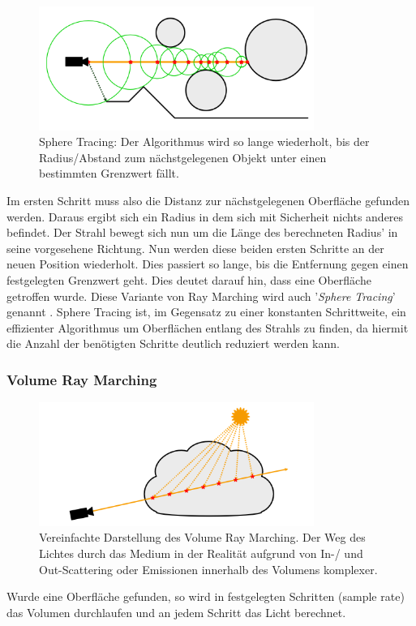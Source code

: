 \begin{figure}[h]
	\centering
	\includegraphics[width=0.80\textwidth]{Grafiken/Basics/Volume/Sphere_Tracing.png}
	\begin{footnotesize}
		\caption{Sphere Tracing: Der Algorithmus wird so lange wiederholt, bis der Radius/Abstand zum nächstgelegenen
        Objekt unter einen bestimmten Grenzwert fällt.}
	\end{footnotesize}
\end{figure}



Im ersten Schritt muss also die Distanz zur nächstgelegenen Oberfläche gefunden werden. Daraus ergibt sich ein Radius in dem sich 
mit Sicherheit nichts anderes befindet. Der Strahl bewegt sich nun um die Länge des berechneten Radius' in seine vorgesehene Richtung.
Nun werden diese beiden ersten Schritte an der neuen Position wiederholt. Dies passiert so lange, bis die Entfernung gegen einen festgelegten
Grenzwert geht. Dies deutet darauf hin, dass eine Oberfläche getroffen wurde. Diese Variante von Ray Marching wird auch 
'\textit{Sphere Tracing}' genannt \parencite{Hart96}. Sphere Tracing ist, im Gegensatz zu einer konstanten Schrittweite, ein effizienter Algorithmus um 
Oberflächen entlang des Strahls zu finden, da hiermit die Anzahl der benötigten Schritte deutlich reduziert werden kann. 


\subsubsection{Volume Ray Marching}

\begin{figure}[h]
	\centering
    \includegraphics[width=0.80\textwidth]{Grafiken/Basics/Volume/Volume_RayMarching.png}
	\begin{footnotesize}
		\caption{Vereinfachte Darstellung des Volume Ray Marching. Der Weg des Lichtes durch 
        das Medium in der Realität aufgrund von In-/ und Out-Scattering oder Emissionen innerhalb des
        Volumens komplexer.}
	\end{footnotesize}
\end{figure}


Wurde eine Oberfläche gefunden, so wird in festgelegten Schritten (sample rate) das Volumen durchlaufen und an jedem Schritt das Licht berechnet.



